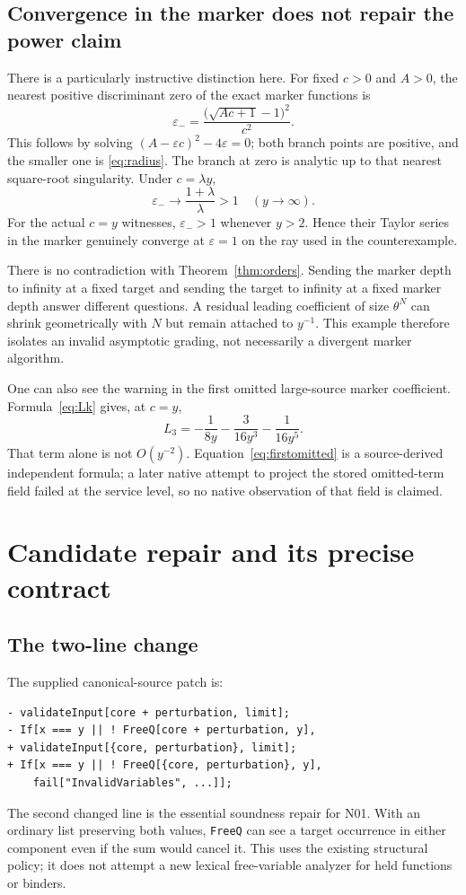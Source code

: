 \documentclass[11pt,letterpaper]{article}
\theoremstyle{remark}\newtheorem{remark}[theorem]{Remark}
\newcommand{\code}[1]{\texttt{#1}}
\newcommand{\eps}{\varepsilon}
\begin{document}
\subsection{Convergence in the marker does not repair the power claim}
There is a particularly instructive distinction here. For fixed $c>0$ and
$A>0$, the nearest positive discriminant zero of the exact marker functions is
\begin{equation}\label{eq:radius}
 \eps_- = \frac{\bigl(\sqrt{Ac+1}-1\bigr)^2}{c^2}.
\end{equation}
This follows by solving $(A-\eps c)^2-4\eps=0$; both branch points are positive,
and the smaller one is \eqref{eq:radius}. The branch at zero is analytic up to
that nearest square-root singularity. Under $c=\lambda y$,
\[
 \eps_-\longrightarrow\frac{1+\lambda}{\lambda}>1
 \quad(y\to\infty).
\]
For the actual $c=y$ witnesses, $\eps_->1$ whenever $y>2$. Hence their Taylor
series in the marker genuinely converge at $\eps=1$ on the ray used in the
counterexample.

There is no contradiction with Theorem~\ref{thm:orders}. Sending the marker
depth to infinity at a fixed target and sending the target to infinity at a
fixed marker depth answer different questions. A residual leading coefficient
of size $\theta^N$ can shrink geometrically with $N$ but remain attached to
$y^{-1}$. This example therefore isolates an invalid asymptotic grading, not
necessarily a divergent marker algorithm.

One can also see the warning in the first omitted large-source marker
coefficient. Formula~\eqref{eq:Lk} gives, at $c=y$,
\begin{equation}\label{eq:firstomitted}
 L_3=-\frac1{8y}-\frac3{16y^3}-\frac1{16y^5}.
\end{equation}
That term alone is not $O(y^{-2})$. Equation~\eqref{eq:firstomitted} is a
source-derived independent formula; a later native attempt to project the
stored omitted-term field failed at the service level, so no native observation
of that field is claimed.

\section{Candidate repair and its precise contract}
\subsection{The two-line change}
The supplied canonical-source patch is:
\begin{lstlisting}
- validateInput[core + perturbation, limit];
- If[x === y || ! FreeQ[core + perturbation, y],
+ validateInput[{core, perturbation}, limit];
+ If[x === y || ! FreeQ[{core, perturbation}, y],
    fail["InvalidVariables", ...]];
\end{lstlisting}
The second changed line is the essential soundness repair for N01. With an
ordinary list preserving both values, \code{FreeQ} can see a target occurrence
in either component even if the sum would cancel it. This uses the existing
structural policy; it does not attempt a new lexical free-variable analyzer
for held functions or binders.
\end{document}
